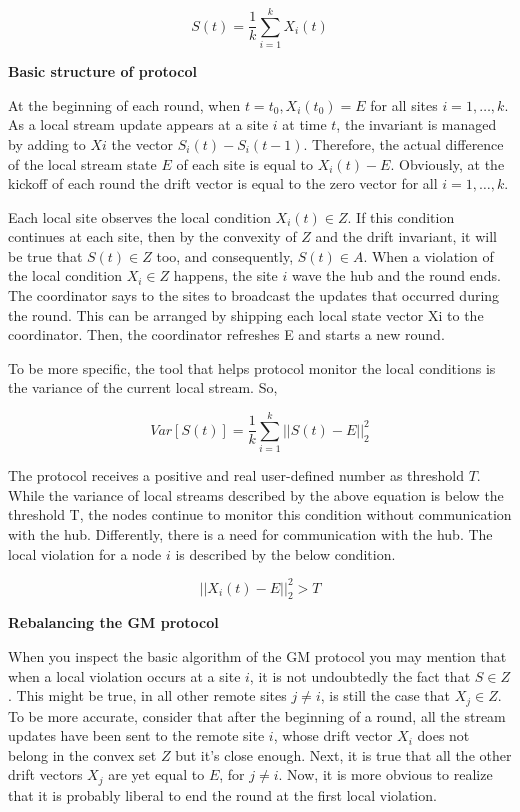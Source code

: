 \begin{equation}
    S(t) = \frac{1}{k} \sum_{i=1}^{k} X_i(t)\label{eq:equation31}
\end{equation}

{\large \textbf{Basic structure of protocol}}

At the beginning of each round, when $t = t_0, X_i(t_0) = E$ for all sites $i = 1, \dots, k$.
As a local stream update appears at a site $i$ at time $t$, the invariant is managed by adding to $Xi$ the vector $S_i(t) - S_i(t-1)$.
Therefore, the actual difference of the local stream state $E$ of each site is equal to $X_i(t) - E$.
Obviously, at the kickoff of each round the drift vector is equal to the zero vector for all $i = 1, \dots, k$.

Each local site observes the local condition $X_i(t) \in Z$.
If this condition continues at each site, then by the convexity of $Z$ and the drift invariant, it will be true that $S(t) \in Z$ too, and consequently, $S(t) \in A$.
When a violation of the local condition $X_i \in Z$ happens, the site $i$ wave the hub and the round ends.
The coordinator says to the sites to broadcast the updates that occurred during the round.
This can be arranged by shipping each local state vector Xi to the coordinator.
Then, the coordinator refreshes E and starts a new round.

To be more specific, the tool that helps protocol monitor the local conditions is the variance of the current local stream.
So,

\begin{equation}
    Var[S(t)] = \frac{1}{k} \sum_{i=1}^{k} ||S(t) - E ||^2_2\label{eq:equation32}
\end{equation}

The protocol receives a positive and real user-defined number as threshold $T$.
While the variance of local streams described by the above equation is below the threshold T,
the nodes continue to monitor this condition without communication with the hub.
Differently, there is a need for communication with the hub.
The local violation for a node $i$ is described by the below condition.

\begin{equation}
    ||X_i(t) - E ||^2_2 > T\label{eq:equation33}
\end{equation}

{\large \textbf{Rebalancing the GM protocol}}

When you inspect the basic algorithm of the GM protocol you may mention that when a local violation occurs at a site $i$,
it is not undoubtedly the fact that $S \in Z$.
This might be true, in all other remote sites $j \neq i$, is still the case that $X_j \in Z$.
To be more accurate, consider that after the beginning of a round, all the stream updates have been sent to the remote site $i$,
whose drift vector $X_i$ does not belong in the convex set $Z$ but it’s close enough.
Next, it is true that all the other drift vectors $X_j$ are yet equal to $E$, for $j \neq i$.
Now, it is more obvious to realize that it is probably liberal to end the round at the first local violation.

